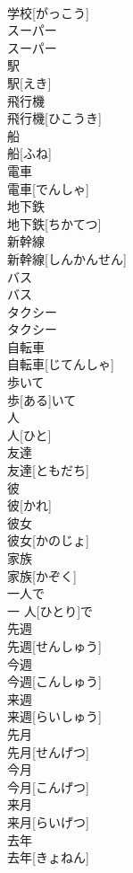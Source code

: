 \documentclass[8pt]{extreport}
\begin{document}
\begin{CJK}{UTF8}{min}
\\	学校[がっこう]	
\\	スーパー	
\\	スーパー	
\\	駅	
\\	駅[えき]	
\\	飛行機	
\\	飛行機[ひこうき]	
\\	船	
\\	船[ふね]	
\\	電車	
\\	電車[でんしゃ]	
\\	地下鉄	
\\	地下鉄[ちかてつ]	
\\	新幹線	
\\	新幹線[しんかんせん]	
\\	バス	
\\	バス	
\\	タクシー	
\\	タクシー	
\\	自転車	
\\	自転車[じてんしゃ]	
\\	歩いて	
\\	歩[ある]いて	
\\	人	
\\	人[ひと]	
\\	友達	
\\	友達[ともだち]	
\\	彼	
\\	彼[かれ]	
\\	彼女	
\\	彼女[かのじょ]	
\\	家族	
\\	家族[かぞく]	
\\	一人で	
\\	一 人[ひとり]で	
\\	先週	
\\	先週[せんしゅう]	
\\	今週	
\\	今週[こんしゅう]	
\\	来週	
\\	来週[らいしゅう]	
\\	先月	
\\	先月[せんげつ]	
\\	今月	
\\	今月[こんげつ]	
\\	来月	
\\	来月[らいげつ]	
\\	去年	
\\	去年[きょねん]	

\end{CJK}
\end{document}

